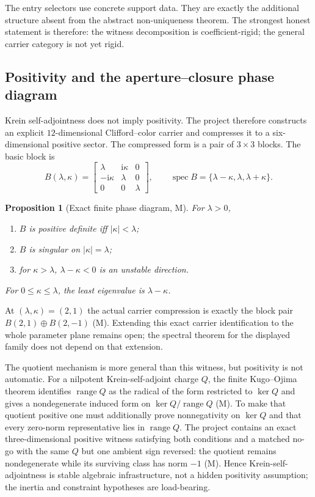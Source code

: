 \documentclass[11pt]{article}
\newcommand{\Mtag}{\textcolor{verified}{\textsc{M}}}
\newcommand{\ii}{\mathrm{i}}
\newtheorem{proposition}[theorem]{Proposition}
\begin{document}
The entry selectors use concrete support data.  They are exactly the additional
structure absent from the abstract non-uniqueness theorem.  The strongest
honest statement is therefore: the witness decomposition is coefficient-rigid;
the general carrier category is not yet rigid.

\subsection{Positivity and the aperture--closure phase diagram}

Krein self-adjointness does not imply positivity.  The project therefore
constructs an explicit $12$-dimensional Clifford--color carrier and compresses
it to a six-dimensional positive sector.  The compressed form is a pair of
$3\times3$ blocks.  The basic block is
\begin{equation}\label{eq:B}
 B(\lambda,\kappa)=
 \begin{bmatrix}
 \lambda&\ii\kappa&0\\
 -\ii\kappa&\lambda&0\\
 0&0&\lambda
 \end{bmatrix},
 \qquad
 \operatorname{spec}B=\{\lambda-\kappa,\lambda,\lambda+\kappa\}.
\end{equation}

\begin{proposition}[Exact finite phase diagram, \Mtag]
For $\lambda>0$,
\begin{enumerate}[label=(\alph*)]
  \item $B$ is positive definite iff $|\kappa|<\lambda$;
  \item $B$ is singular on $|\kappa|=\lambda$;
  \item for $\kappa>\lambda$, $\lambda-\kappa<0$ is an unstable direction.
\end{enumerate}
For $0\leq\kappa\leq\lambda$, the least eigenvalue is
$\lambda-\kappa$.
\end{proposition}

At $(\lambda,\kappa)=(2,1)$ the actual carrier compression is exactly the
block pair $B(2,1)\oplus B(2,-1)$ (\Mtag).  Extending this exact carrier
identification to the whole parameter plane remains open; the spectral theorem
for the displayed family does not depend on that extension.

The quotient mechanism is more general than this witness, but positivity is
not automatic.  For a nilpotent Krein-self-adjoint charge $Q$, the finite
Kugo--Ojima theorem identifies $\operatorname{range}Q$ as the radical of the
form restricted to $\ker Q$ and gives a nondegenerate induced form on
$\ker Q/\operatorname{range}Q$ (\Mtag).  To make that quotient positive one
must additionally prove nonnegativity on $\ker Q$ and that every zero-norm
representative lies in $\operatorname{range}Q$.  The project contains an exact
three-dimensional positive witness satisfying both conditions and a matched
no-go with the same $Q$ but one ambient sign reversed: the quotient remains
nondegenerate while its surviving class has norm $-1$ (\Mtag).  Hence
Krein-self-adjointness is stable algebraic infrastructure, not a hidden
positivity assumption; the inertia and constraint hypotheses are load-bearing.
\end{document}
